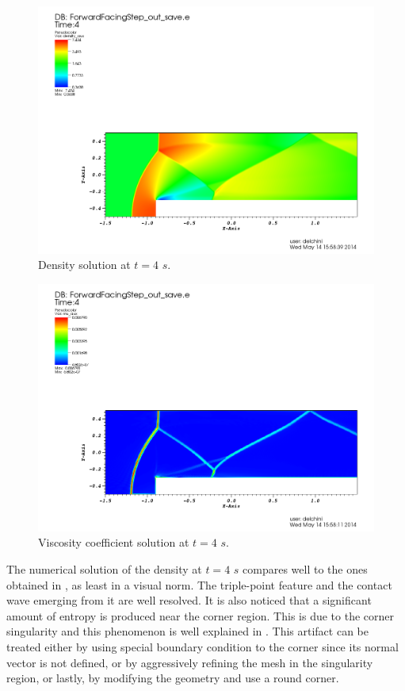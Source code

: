 \begin{figure}[H]
\centering
\includegraphics[scale=.50]{figures/FFSDensityEqualTo4.png}
\caption{Density solution at $t=4$ $s$.}
\label{fig:2d_ffs_rho_4}
\end{figure}
%
\begin{figure}[H]
\centering
\includegraphics[scale=.50]{figures/FFSViscEqualTo4.png}
\caption{Viscosity coefficient solution at $t=4$ $s$.}
\label{fig:2d_ffs_visc_4}
\end{figure}
%
The numerical solution of the density at $t=4$ $s$ compares well to the ones obtained in \cite{valentin}, as least in a visual norm. The triple-point feature and the contact wave emerging from it are well resolved. It is also noticed that a significant amount of entropy is produced near the corner region. This is due to the corner singularity and this phenomenon is well explained in \cite{FFS_corner}. This artifact can be treated either by using special boundary condition to the corner since its normal vector is not defined, or by aggressively refining the mesh in the singularity region, or lastly, by modifying the geometry and use a round corner. 
